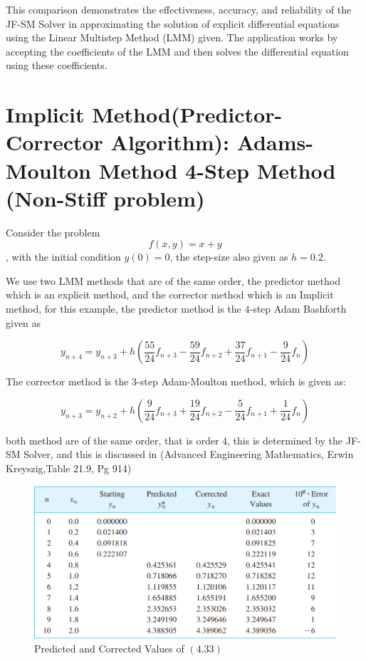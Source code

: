 This comparison demonstrates the effectiveness, accuracy, and reliability of the JF-SM Solver in approximating the solution of explicit differential equations using the Linear Multistep Method (LMM) given. The application works by accepting the coefficients of the LMM and then solves the differential equation using these coefficients.

\section{Implicit Method(Predictor-Corrector Algorithm): Adams-Moulton Method 4-Step Method (Non-Stiff problem)}

Consider the problem \begin{equation}
    f(x,y) = x + y
\end{equation}, with the initial condition $y(0) = 0$, the step-size also given as $h = 0.2$.

We use two LMM methods that are of the same order, the predictor method which is an explicit method, and the corrector method which is an Implicit method, for this example, the predictor method is the 4-step Adam Bashforth given as

\begin{equation}
    y_{n+4}  = y_{n+3} + h \left(\frac{55}{24}f_{n+3} - \frac{59}{24}f_{n+2} + \frac{37}{24}f_{n+1} - \frac{9}{24}f_{n}\right)
\end{equation}

The corrector method is the 3-step Adam-Moulton method, which is given as:

\begin{equation}
    y_{n+3}  = y_{n+2} + h \left(\frac{9}{24}f_{n+3} + \frac{19}{24}f_{n+2} - \frac{5}{24}f_{n+1} + \frac{1}{24}f_{n}\right)
\end{equation}

both method are of the same order, that is order 4, this is determined by the JF-SM Solver, and this is discussed in  (Advanced Engineering Mathematics, Erwin Kreyszig,Table 21.9, Pg 914)

\begin{figure}[htbp]
    \centering
    \includegraphics[width=1\textwidth]{chapters/4/image/solver_4.png}
    \caption{Predicted and Corrected Values of $(4.33)$ }
\end{figure}



